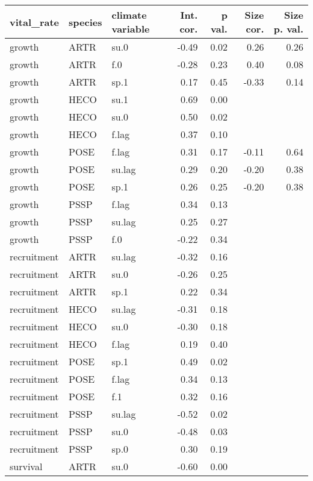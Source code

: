 \documentclass[11pt]{article}
\begin{document}
\begin{table}[ht]
	\centering
	\begin{tabular}{lllrrrr}
		\hline
		vital\_rate & species & climate variable & Int. cor. & p val. & Size cor. & Size p. val. \\ 
		\hline
		growth & ARTR & su.0 & -0.49 & 0.02 & 0.26 & 0.26 \\ 
		growth & ARTR & f.0 & -0.28 & 0.23 & 0.40 & 0.08 \\ 
		growth & ARTR & sp.1 & 0.17 & 0.45 & -0.33 & 0.14 \\ 
		growth & HECO & su.1 & 0.69 & 0.00 &  &  \\ 
		growth & HECO & su.0 & 0.50 & 0.02 &  &  \\ 
		growth & HECO & f.lag & 0.37 & 0.10 &  &  \\ 
		growth & POSE & f.lag & 0.31 & 0.17 & -0.11 & 0.64 \\ 
		growth & POSE & su.lag & 0.29 & 0.20 & -0.20 & 0.38 \\ 
		growth & POSE & sp.1 & 0.26 & 0.25 & -0.20 & 0.38 \\ 
		growth & PSSP & f.lag & 0.34 & 0.13 &  &  \\ 
		growth & PSSP & su.lag & 0.25 & 0.27 &  &  \\ 
		growth & PSSP & f.0 & -0.22 & 0.34 &  &  \\ 
		recruitment & ARTR & su.lag & -0.32 & 0.16 &  &  \\ 
		recruitment & ARTR & su.0 & -0.26 & 0.25 &  &  \\ 
		recruitment & ARTR & sp.1 & 0.22 & 0.34 &  &  \\ 
		recruitment & HECO & su.lag & -0.31 & 0.18 &  &  \\ 
		recruitment & HECO & su.0 & -0.30 & 0.18 &  &  \\ 
		recruitment & HECO & f.lag & 0.19 & 0.40 &  &  \\ 
		recruitment & POSE & sp.1 & 0.49 & 0.02 &  &  \\ 
		recruitment & POSE & f.lag & 0.34 & 0.13 &  &  \\ 
		recruitment & POSE & f.1 & 0.32 & 0.16 &  &  \\ 
		recruitment & PSSP & su.lag & -0.52 & 0.02 &  &  \\ 
		recruitment & PSSP & su.0 & -0.48 & 0.03 &  &  \\ 
		recruitment & PSSP & sp.0 & 0.30 & 0.19 &  &  \\ 
		survival & ARTR & su.0 & -0.60 & 0.00 &  &  \\ 

\end{tabular}
\end{table}
\end{document}
